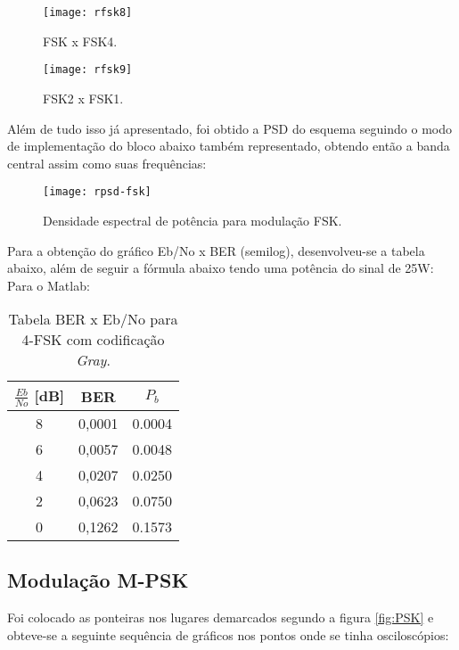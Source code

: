 \begin{figure}[H]
    \centering
    \texttt{[image: rfsk8]}
    \caption{FSK x FSK4.}
    \label{fig:rfsk8}
\end{figure}

\begin{figure}[H]
    \centering
    \texttt{[image: rfsk9]}
    \caption{FSK2 x FSK1.}
    \label{fig:rfsk9}
\end{figure}

Além de tudo isso já apresentado, foi obtido a PSD do esquema seguindo o modo de implementação do bloco abaixo também representado, obtendo então a banda central assim como suas frequências:

\begin{figure}[H]
    \centering
    \texttt{[image: rpsd-fsk]}
    \caption{Densidade espectral de potência para modulação FSK.}
    \label{fig:rsdfsk}
\end{figure}

Para a obtenção do gráfico Eb/No x BER (semilog), desenvolveu-se a tabela abaixo, além de seguir a fórmula abaixo tendo uma potência do sinal de 25W:
Para o Matlab:

\begin{small}
    \begin{table}[H]
        \begin{center}
            \caption{Tabela BER x Eb/No para 4-FSK com codificação \textit{Gray}.}
            \begin{tabular}{c|c|c}
                \hline
                $\frac{Eb}{No}$ [dB] & BER & $P_b$ \\
                \hline
                8 & 0,0001 & 0.0004\\
                \hline
                6 & 0,0057 & 0.0048 \\
                \hline
                4 & 0,0207 & 0.0250 \\
                \hline
                2 & 0,0623 & 0.0750 \\
                \hline
                0 & 0,1262 & 0.1573 \\
                \hline
            \end{tabular}
            \label{tab:3}
        \end{center}
    \end{table}
\end{small}

\subsection{Modulação M-PSK}
Foi colocado as ponteiras nos lugares demarcados segundo a figura \ref{fig:PSK} e obteve-se a seguinte sequência de gráficos nos pontos onde se tinha osciloscópios:

